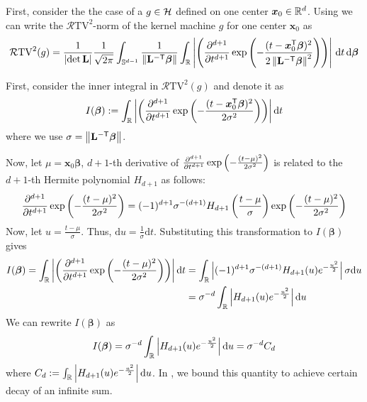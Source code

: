 

First, consider the the case of a $g \in {\mathcal{H}}$ defined on one center $\bm{x}_0 \in \mathbb{R}^d$.
Using  we can write the $\mathcal{R}\mathrm{TV}^2$-norm of the kernel machine $g$ for one center $\bm{x}_0$ as
\begin{equation}
\mathcal{R}\mathrm{TV}^2(g) = \frac{1}{\left|\det \mathbf{L}\right|} \frac{1}{\sqrt{2\pi}} \int_{\mathbb{S}^{d-1}} \frac{1}{{\left\|\mathbf{L}^{-\mathsf{T}}\bm{\beta}\right\|}} 
    \int_\mathbb{R}
    \left|  \left( {\frac{\partial^{d+1}}{\partial t^{d+1}} \exp \left( {-\frac{(t-\bm{x}_0^\mathsf{T}\bm{\beta})^2}{2\left\|\mathbf{L}^{-\mathsf{T}}\bm{\beta}\right\|^2}} \right) } \right) \right| \,\mathrm{d}t\,\mathrm{d}\bm{\beta} \label{eq: tv}
\end{equation}


First, consider the inner integral in $\mathcal{R}\mathrm{TV}^2(g)$ and denote it as
\[
I(\bm{\beta}) := \int_\mathbb{R}
    \left|  \left( {\frac{\partial^{d+1}}{\partial t^{d+1}} \exp \left( {-\frac{(t-\bm{x}_0^\mathsf{T}\bm{\beta})^2}{2\sigma^2}} \right) } \right) \right| \mathrm{d}t
\]
where we use $\sigma = \left\|\mathbf{L}^{-\mathsf{T}}\bm{\beta}\right\|$.

Now, let $\mu = \bm{x}_0\bm{\beta}$, $d+1$-th derivative of $\frac{\partial^{d+1}}{\partial t^{d+1}} \exp \left( {-\frac{(t-\mu)^2}{2\sigma^2}} \right) $ is related to the $d+1$-th Hermite polynomial $H_{d+1}$ as follows:
\[
\frac{\partial^{d+1}}{\partial t^{d+1}} \exp \left( {-\frac{(t-\mu)^2}{2\sigma^2}} \right)  = (-1)^{d+1} \sigma^{-(d+1)} H_{d+1} \left( {\frac{t-\mu}{\sigma}} \right)  \exp \left( {-\frac{(t-\mu)^2}{2\sigma^2}} \right) 
\]
\newline
Now, let $u = \frac{t - \mu}{\sigma}$. Thus, $\mathrm{d}u = \frac{1}{\sigma} \mathrm{d}t$. Substituting this transformation to $I(\bm{\beta})$ gives
\begin{align}
I(\bm{\beta}) = \int_\mathbb{R}
    \left|  \left( {\frac{\partial^{d+1}}{\partial t^{d+1}} \exp \left( {-\frac{(t-\mu)^2}{2\sigma^2}} \right) } \right) \right| \mathrm{d}t &= \int_\mathbb{R} \left| (-1)^{d+1} \sigma^{-(d+1)} H_{d+1}(u) e^{-\frac{u^2}{2}}\right| \sigma \mathrm{d}u \label{eq: singleint1}\\
    &= \sigma^{-d} \int_\mathbb{R} \left|H_{d+1}(u) e^{-\frac{u^2}{2}}\right| \mathrm{d}u \label{eq: singleint2}
\end{align}
We can rewrite $I(\bm{\beta})$ as
\[
I(\bm{\beta}) = \sigma^{-d} \int_\mathbb{R} \left|H_{d+1}(u) e^{-\frac{u^2}{2}}\right| \mathrm{d}u = \sigma^{-d} C_d
\]
where $C_d :=  \int_\mathbb{R} \left|H_{d+1}(u) e^{-\frac{u^2}{2}}\right| \mathrm{d}u$. In , we bound this quantity to achieve certain decay of an infinite sum.

